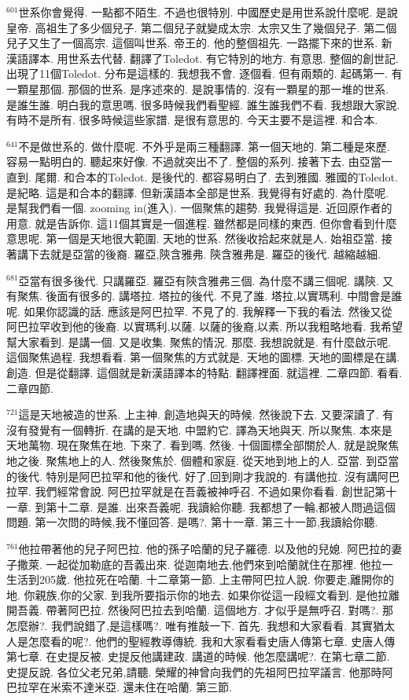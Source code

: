 \documentclass{book}
\begin{document}
$^{601}$世系你會覺得.
一點都不陌生.
不過也很特別.
中國歷史是用世系說什麼呢.
是說皇帝.
高祖生了多少個兒子.
第二個兒子就變成太宗.
太宗又生了幾個兒子.
第二個兒子又生了一個高宗.
這個叫世系.
帝王的.
他的整個祖先.
一路擺下來的世系.
新漢語譯本.
用世系去代替.
翻譯了Toledot.
有它特別的地方.
有意思.
整個的創世記.
出現了11個Toledot.
分布是這樣的.
我想我不會.
逐個看.
但有兩類的.
起碼第一.
有一顆星那個.
那個的世系.
是序述來的.
是說事情的.
沒有一顆星的那一堆的世系.
是誰生誰.
明白我的意思嗎.
很多時候我們看聖經.
誰生誰我們不看.
我想跟大家說.
有時不是所有.
很多時候這些家譜.
是很有意思的.
今天主要不是這裡.
和合本.

$^{641}$不是做世系的.
做什麼呢.
不外乎是兩三種翻譯.
第一個天地的.
第二種是來歷.
容易一點明白的.
聽起來好像.
不過就突出不了.
整個的系列.
接著下去.
由亞當一直到.
尾爾.
和合本的Toledot.
是後代的.
都容易明白了.
去到雅國.
雅國的Toledot.
是紀略.
這是和合本的翻譯.
但新漢語本全部是世系.
我覺得有好處的.
為什麼呢.
是幫我們看一個.
zooming in(進入).
一個聚焦的趨勢.
我覺得這是.
近回原作者的用意.
就是告訴你.
這11個其實是一個進程.
雖然都是同樣的東西.
但你會看到什麼意思呢.
第一個是天地很大範圍.
天地的世系.
然後收拾起來就是人.
始祖亞當.
接著講下去就是亞當的後裔.
羅亞,陝含雅弗.
陝含雅弗是.
羅亞的後代.
越縮越細.

$^{681}$亞當有很多後代.
只講羅亞.
羅亞有陝含雅弗三個.
為什麼不講三個呢.
講陝.
又有聚焦.
後面有很多的.
講塔拉.
塔拉的後代.
不見了誰.
塔拉,以實瑪利.
中間會是誰呢.
如果你認識的話.
應該是阿巴拉罕.
不見了的.
我解釋一下我的看法.
然後又從阿巴拉罕收到他的後裔.
以實瑪利,以薩.
以薩的後裔,以素.
所以我粗略地看.
我希望幫大家看到.
是講一個.
又是收集.
聚焦的情況.
那麼.
我想說就是.
有什麼啟示呢.
這個聚焦過程.
我想看看.
第一個聚焦的方式就是.
天地的圖標.
天地的圖標是在講.
創造.
但是從翻譯.
這個就是新漢語譯本的特點.
翻譯裡面.
就這裡.
二章四節.
看看.
二章四節.

$^{721}$這是天地被造的世系.
上主神.
創造地與天的時候.
然後說下去.
又要深讀了.
有沒有發覺有一個轉折.
在講的是天地.
中盟約它.
譯為天地與天.
所以聚焦.
本來是天地萬物.
現在聚焦在地.
下來了.
看到嗎.
然後.
十個圖標全部關於人.
就是說聚焦地之後.
聚焦地上的人.
然後聚焦於.
個體和家庭.
從天地到地上的人.
亞當.
到亞當的後代.
特別是阿巴拉罕和他的後代.
好了,回到剛才我說的.
有講他拉.
沒有講阿巴拉罕.
我們經常會說.
阿巴拉罕就是在吾義被神呼召.
不過如果你看看.
創世記第十一章.
到第十二章.
是誰.
出來吾義呢.
我讀給你聽.
我都想了一輪,都被人問過這個問題.
第一次問的時候,我不懂回答.
是嗎?.
第十一章.
第三十一節,我讀給你聽.

$^{761}$他拉帶著他的兒子阿巴拉.
他的孫子哈蘭的兒子羅德.
以及他的兒媳.
阿巴拉的妻子撒萊.
一起從加勒底的吾義出來.
從迦南地去,他們來到哈蘭就住在那裡.
他拉一生活到205歲.
他拉死在哈蘭.
十二章第一節.
上主帶阿巴拉人說.
你要走,離開你的地.
你親族,你的父家.
到我所要指示你的地去.
如果你從這一段經文看到.
是他拉離開吾義.
帶著阿巴拉.
然後阿巴拉去到哈蘭.
這個地方.
才似乎是無呼召.
對嗎?.
那怎麼辦?.
我們說錯了,是這樣嗎?.
唯有推敲一下.
首先.
我想和大家看看.
其實猶太人是怎麼看的呢?.
他們的聖經教導傳統.
我和大家看看史唐人傳第七章.
史唐人傳第七章.
在史提反被.
史提反他講建政.
講道的時候.
他怎麼講呢?.
在第七章二節.
史提反說.
各位父老兄弟,請聽.
榮耀的神曾向我們的先祖阿巴拉罕議言.
他那時阿巴拉罕在米索不達米亞.
還未住在哈蘭.
第三節.
\end{document}
